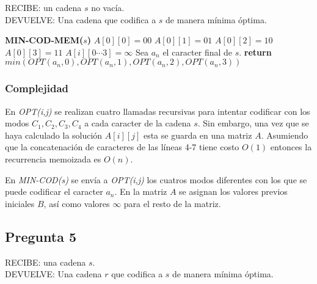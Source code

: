 \vspace{0.5cm}

\noindent RECIBE: un cadena $s$ no vacía.\\
DEVUELVE: Una cadena que codifica a $s$ de manera mínima óptima.
\begin{algorithmic}[1]
\item[]{\textbf{MIN-COD-MEM($s$)}}
\State $A[0][0] = 00$ 
\State $A[0][1] = 01$ 
\State $A[0][2] = 10$ 
\State $A[0][3] = 11$
    \State $A[i][0\cdots3] = \infty$ 
\EndFor 
\State Sea $a_n$ el caracter final de $s$.  
\State \textbf{return} $min(OPT(a_n,0), OPT(a_n,1), OPT(a_n,2), OPT(a_n,3))$  
\end{algorithmic}


\subsubsection{Complejidad}

En \emph{OPT(i,j)} se realizan cuatro llamadas recursivas para intentar codificar con los modos $C_1,C_2,C_3,C_4$ 
a cada caracter de la cadena $s$. Sin embargo, una vez que se haya calculado la solución $A[i][j]$ esta se guarda en 
una matriz $A$. Asumiendo que la concatenación de caracteres de las líneas 4-7 tiene costo $O(1)$ entonces la 
recurrencia memoizada es $O(n)$.

En \emph{MIN-COD(s)} se envía a \emph{OPT(i,j)} los cuatros modos diferentes con los que se puede codificar el caracter 
$a_n$. En la matriz $A$ se asignan los valores previos iniciales $B$, así como valores $\infty$ para el resto de la matriz.

\newpage

\subsection{Pregunta 5}
\noindent RECIBE: una cadena $s$.\\
DEVUELVE: Una cadena $r$ que codifica a $s$ de manera mínima óptima.

